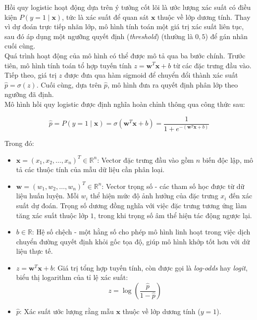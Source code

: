 Hồi quy logistic hoạt động dựa trên ý tưởng cốt lõi là ước lượng xác suất có điều kiện $P(y = 1 \mid \mathbf{x})$, tức là xác suất để quan sát $\mathbf{x}$ thuộc về lớp dương tính. Thay vì dự đoán trực tiếp nhãn lớp, mô hình tính toán một giá trị xác suất liên tục, sau đó áp dụng một ngưỡng quyết định (\textit{threshold}) (thường là $0{,}5$) để gán nhãn cuối cùng.\\
 
Quá trình hoạt động của mô hình có thể được mô tả qua ba bước chính. Trước tiên, mô hình tính toán tổ hợp tuyến tính $z = \mathbf{w}^{T}\mathbf{x} + b$ từ các đặc trưng đầu vào. Tiếp theo, giá trị $z$ được đưa qua hàm sigmoid để chuyển đổi thành xác suất $\hat{p} = \sigma(z)$. Cuối cùng, dựa trên $\hat{p}$, mô hình đưa ra quyết định phân lớp theo ngưỡng đã định.\\
 
Mô hình hồi quy logistic được định nghĩa hoàn chỉnh thông qua công thức sau:
 
\begin{equation}
  \hat{p} = P(y = 1 \mid \mathbf{x})
           = \sigma\!\left(\mathbf{w}^{T}\mathbf{x} + b\right)
           = \frac{1}{1 + e^{-(\mathbf{w}^{T}\mathbf{x} + b)}}
  \label{eq:logreg}
\end{equation}
 
\noindent Trong đó:
 
\begin{itemize}
  \item $\mathbf{x} = (x_1, x_2, \ldots, x_n)^{T} \in \mathbb{R}^{n}$: Vector đặc trưng đầu vào gồm $n$ biến độc lập, mô tả các thuộc tính của mẫu dữ liệu cần phân loại.
 
  \item $\mathbf{w} = (w_1, w_2, \ldots, w_n)^{T} \in \mathbb{R}^{n}$: Vector trọng số - các tham số học được từ dữ liệu huấn luyện. Mỗi $w_i$ thể hiện mức độ ảnh hưởng của đặc trưng $x_i$ đến xác suất dự đoán. Trọng số dương đồng nghĩa với việc đặc trưng tương ứng làm tăng xác suất thuộc lớp $1$, trong khi trọng số âm thể hiện tác động ngược lại.
 
  \item $b \in \mathbb{R}$: Hệ số chệch - một hằng số cho phép mô hình linh hoạt trong việc dịch chuyển đường quyết định khỏi gốc tọa độ, giúp mô hình khớp tốt hơn với dữ liệu thực tế.
 
  \item $z = \mathbf{w}^{T}\mathbf{x} + b$: Giá trị tổng hợp tuyến tính, còn được gọi là \textit{log-odds} hay \textit{logit}, biểu thị logarithm của tỉ lệ xác suất:
  \[
    z = \log\!\left(\frac{\hat{p}}{1 - \hat{p}}\right)
  \]
 
  \item $\hat{p}$: Xác suất ước lượng rằng mẫu $\mathbf{x}$ thuộc về lớp dương tính ($y = 1$).
\end{itemize}
 

